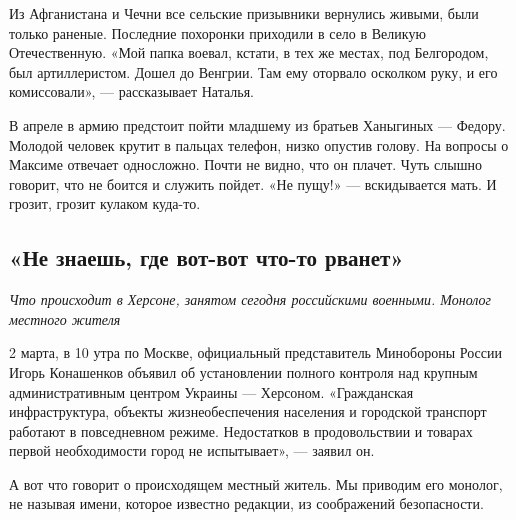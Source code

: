 Из Афганистана и Чечни все сельские призывники вернулись живыми, были только раненые. Последние похоронки приходили в село в Великую Отечественную. «Мой папка воевал, кстати, в тех же местах, под Белгородом, был артиллеристом. Дошел до Венгрии. Там ему оторвало осколком руку, и его комиссовали», --- рассказывает Наталья.

В апреле в армию предстоит пойти младшему из братьев Ханыгиных --- Федору. Молодой человек крутит в пальцах телефон, низко опустив голову. На вопросы о Максиме отвечает односложно. Почти не видно, что он плачет. Чуть слышно говорит, что не боится и служить пойдет. «Не пущу!» --- вскидывается мать. И грозит, грозит кулаком куда-то.


\subsection{«Не знаешь, где вот-вот что-то рванет»}
\textit{Что происходит в Херсоне, занятом сегодня российскими военными. Монолог местного жителя}


2 марта, в 10 утра по Москве, официальный представитель Минобороны России Игорь Конашенков объявил об установлении полного контроля над крупным административным центром Украины --- Херсоном. «Гражданская инфраструктура, объекты жизнеобеспечения населения и городской транспорт работают в повседневном режиме. Недостатков в продовольствии и товарах первой необходимости город не испытывает», --- заявил он.

А вот что говорит о происходящем местный житель. Мы приводим его монолог, не называя имени, которое известно редакции, из соображений безопасности.


